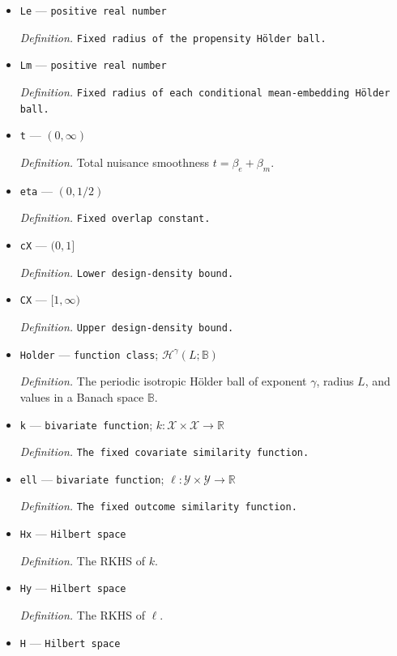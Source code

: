 \documentclass{article}
\begin{document}
\begin{itemize}
  \item \texttt{Le} --- \texttt{positive real number}
  \par\smallskip\noindent\emph{Definition.} \texttt{Fixed radius of the propensity Hölder ball.}
  \item \texttt{Lm} --- \texttt{positive real number}
  \par\smallskip\noindent\emph{Definition.} \texttt{Fixed radius of each conditional mean-\allowbreak{}embedding Hölder ball.}
  \item \texttt{t} --- \((0,\infty)\)
  \par\smallskip\noindent\emph{Definition.} Total nuisance smoothness \(t=\beta_e+\beta_m\).
  \item \texttt{eta} --- \((0,1/2)\)
  \par\smallskip\noindent\emph{Definition.} \texttt{Fixed overlap constant.}
  \item \texttt{cX} --- \((0,1]\)
  \par\smallskip\noindent\emph{Definition.} \texttt{Lower design-\allowbreak{}density bound.}
  \item \texttt{CX} --- \([1,\infty)\)
  \par\smallskip\noindent\emph{Definition.} \texttt{Upper design-\allowbreak{}density bound.}
  \item \texttt{Holder} --- \texttt{function class}; \(\mathcal H^{\gamma}(L;\mathbb B)\)
  \par\smallskip\noindent\emph{Definition.} The periodic isotropic Hölder ball of exponent \(\gamma\), radius \(L\), and values in a Banach space \(\mathbb B\).
  \item \texttt{k} --- \texttt{bivariate function}; \(k:\mathcal X\times\mathcal X\to\mathbb R\)
  \par\smallskip\noindent\emph{Definition.} \texttt{The fixed covariate similarity function.}
  \item \texttt{ell} --- \texttt{bivariate function}; \(\ell:\mathcal Y\times\mathcal Y\to\mathbb R\)
  \par\smallskip\noindent\emph{Definition.} \texttt{The fixed outcome similarity function.}
  \item \texttt{Hx} --- \texttt{Hilbert space}
  \par\smallskip\noindent\emph{Definition.} The RKHS of \(k\).
  \item \texttt{Hy} --- \texttt{Hilbert space}
  \par\smallskip\noindent\emph{Definition.} The RKHS of \(\ell\).
  \item \texttt{H} --- \texttt{Hilbert space}

\end{itemize}
\end{document}
